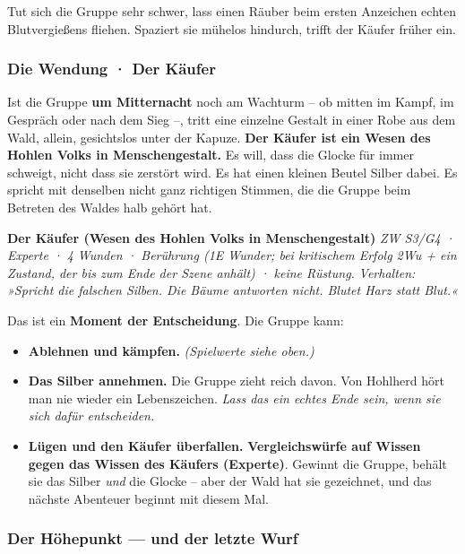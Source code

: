 \documentclass[10pt,a4paper]{article}
\newcommand{\tightlist}{\setlength{\itemsep}{0pt}\setlength{\parskip}{0pt}}
\begin{document}
Tut sich die Gruppe sehr schwer, lass einen Räuber beim ersten Anzeichen echten Blutvergießens fliehen. Spaziert sie mühelos hindurch, trifft der Käufer früher ein.

\subsubsection{Die Wendung · Der Käufer}\label{die-wendung-der-kuxe4ufer}

Ist die Gruppe \textbf{um Mitternacht} noch am Wachturm -- ob mitten im Kampf, im Gespräch oder nach dem Sieg --, tritt eine einzelne Gestalt in einer Robe aus dem Wald, allein, gesichtslos unter der Kapuze. \textbf{Der Käufer ist ein Wesen des Hohlen Volks in Menschengestalt.} Es will, dass die Glocke für immer schweigt, nicht dass sie zerstört wird. Es hat einen kleinen Beutel Silber dabei. Es spricht mit denselben nicht ganz richtigen Stimmen, die die Gruppe beim Betreten des Waldes halb gehört hat.

\par\smallskip\begin{rpgnote}[fontupper=\normalfont]\textbf{Der Käufer (Wesen des Hohlen Volks in Menschengestalt)} \emph{ZW S3/G4 · Experte · 4 Wunden · Berührung (1E Wunder; bei kritischem Erfolg 2Wu + ein Zustand, der bis zum Ende der Szene anhält) · keine Rüstung.} \emph{Verhalten: »Spricht die falschen Silben. Die Bäume antworten nicht. Blutet Harz statt Blut.«}\end{rpgnote}\par\smallskip
Das ist ein \textbf{Moment der Entscheidung}. Die Gruppe kann:

\begin{itemize}
\tightlist
\item
  \textbf{Ablehnen und kämpfen.} \emph{(Spielwerte siehe oben.)}
\item
  \textbf{Das Silber annehmen.} Die Gruppe zieht reich davon. Von Hohlherd hört man nie wieder ein Lebenszeichen. \emph{Lass das ein echtes Ende sein, wenn sie sich dafür entscheiden.}
\item
  \textbf{Lügen und den Käufer überfallen.} \textbf{Vergleichswürfe auf Wissen gegen das Wissen des Käufers (Experte)}. Gewinnt die Gruppe, behält sie das Silber \emph{und} die Glocke -- aber der Wald hat sie gezeichnet, und das nächste Abenteuer beginnt mit diesem Mal.
\end{itemize}

\subsubsection{Der Höhepunkt --- und der letzte Wurf}\label{der-huxf6hepunkt-der-letzte-wurf}
\end{document}
